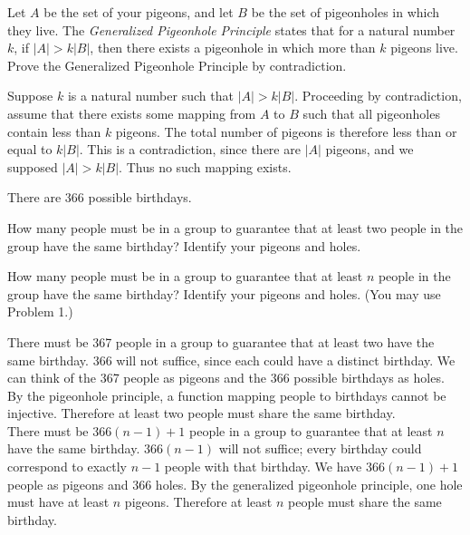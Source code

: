\documentclass[solution, letterpaper]{cs20}
\begin{document}


 Let $A$ be the set of your pigeons, and let $B$ be the set of pigeonholes in which they live. The \textit{Generalized Pigeonhole Principle} states that for a natural number $k$, if $|A| > k|B|$, then there exists a pigeonhole in which more than $k$ pigeons live. Prove the Generalized Pigeonhole Principle by contradiction.
 
\begin{solution}
Suppose $k$ is a natural number such that $|A| > k|B|$. Proceeding by contradiction, assume that there exists some mapping from $A$ to $B$ such that all pigeonholes contain less than $k$ pigeons. The total number of pigeons is therefore less than or equal to $k|B|$. This is a contradiction, since there are $|A|$ pigeons, and we supposed $|A| > k|B|$. Thus no such mapping exists.
\end{solution}


There are 366 possible birthdays.

\subproblem How many people must be in a group to guarantee that at least two people in the group have the same birthday? Identify your pigeons and holes.

\subproblem How many people must be in a group to guarantee that at least $n$ people in the group have the same birthday? Identify your pigeons and holes. (You may use Problem 1.)

\begin{solution}
  \subsolution There must be 367 people in a group to guarantee that at least two have the same birthday. 366 will not suffice, since each could have a distinct birthday. We can think of the 367 people as pigeons and the 366 possible birthdays as holes. By the pigeonhole principle, a function mapping people to birthdays cannot be injective. Therefore at least two people must share the same birthday. 
  \\
  \subsolution There must be $366(n-1) + 1$ people in a group to guarantee that at least $n$ have the same birthday. $366(n-1)$ will not suffice; every birthday could correspond to exactly $n-1$ people with that birthday. We have $366(n-1) + 1$ people as pigeons and 366 holes. By the generalized pigeonhole principle, one hole must have at least $n$ pigeons. Therefore at least $n$ people must share the same birthday.
\end{solution}
\end{document}
